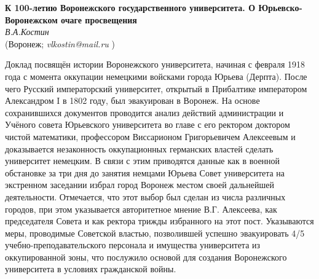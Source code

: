 \begin{center}{ \bf  К 100-летию Воронежского государственного университета. О Юрьевско-Воронежском очаге просвещения}\\
{\it В.А.Костин } \\
(Воронеж; {\it vlkostin@mail.ru} )\\
\end{center}

Доклад посвящён истории Воронежского университета,
начиная с февраля 1918 года с момента оккупации немецкими войсками города Юрьева (Дерпта).
После чего Русский императорский университет, открытый в Прибалтике императором Александром I в 1802 году,
был эвакуирован в Воронеж.
На основе сохранившихся документов проводится анализ действий администрации и Учёного совета Юрьевского университета во главе с его ректором доктором чистой математики, профессором Виссарионом Григорьевичем Алексеевым и доказывается незаконность оккупационных германских властей сделать университет немецким. В связи с этим приводятся данные как в военной обстановке за три дня до занятия немцами Юрьева Совет университета на экстренном заседании избрал город Воронеж местом своей дальнейшей деятельности. Отмечается, что этот выбор был сделан из числа различных городов, при этом указывается авторитетное мнение В.Г.  Алексеева, как председателя Совета и как ректора трижды избранного на этот пост. Указываются меры, проводимые Советской властью, позволившей успешно эвакуировать 4/5 учебно-преподавательского персонала и имущества университета из оккупированной зоны, что послужило основой для создания Воронежского университета в условиях гражданской войны.

